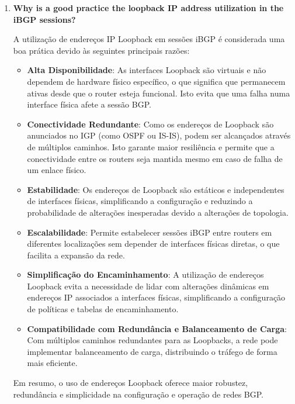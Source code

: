 \documentclass[11pt,english, openright, oneside]{book}
\begin{document}
\begin{enumerate}
  \vspace{0.2cm}

  \item \textbf{Why is a good practice the loopback IP address utilization in the iBGP sessions?} 
  \vspace{0.2cm}

  A utilização de endereços IP Loopback em sessões iBGP é considerada uma boa prática devido às seguintes principais razões:

  \begin{itemize}
    \item \textbf{Alta Disponibilidade}: As interfaces Loopback são virtuais e não dependem de hardware físico específico, o que significa que permanecem ativas desde que o router esteja funcional. Isto evita que uma falha numa interface física afete a sessão BGP.
    \item \textbf{Conectividade Redundante}: Como os endereços de Loopback são anunciados no IGP (como OSPF ou IS-IS), podem ser alcançados através de múltiplos caminhos. Isto garante maior resiliência e permite que a conectividade entre os routers seja mantida mesmo em caso de falha de um enlace físico.
    \item \textbf{Estabilidade}: Os endereços de Loopback são estáticos e independentes de interfaces físicas, simplificando a configuração e reduzindo a probabilidade de alterações inesperadas devido a alterações de topologia.
    \item \textbf{Escalabilidade}: Permite estabelecer sessões iBGP entre routers em diferentes localizações sem depender de interfaces físicas diretas, o que facilita a expansão da rede.
    \item \textbf{Simplificação do Encaminhamento}: A utilização de endereços Loopback evita a necessidade de lidar com alterações dinâmicas em endereços IP associados a interfaces físicas, simplificando a configuração de políticas e tabelas de encaminhamento.
    \item \textbf{Compatibilidade com Redundância e Balanceamento de Carga}: Com múltiplos caminhos redundantes para as Loopbacks, a rede pode implementar balanceamento de carga, distribuindo o tráfego de forma mais eficiente.
  \end{itemize}
  \vspace{0.2cm}

  Em resumo, o uso de endereços Loopback oferece maior robustez, redundância e simplicidade na configuração e operação de redes BGP.
  \vspace{0.2cm}


\end{enumerate}
\end{document}
